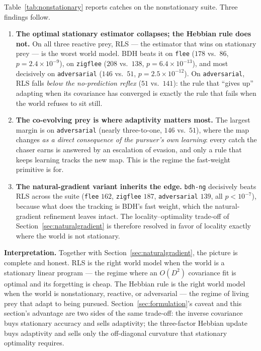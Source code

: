 \documentclass[11pt]{article}
\begin{document}
Table~\ref{tab:nonstationary} reports catches on the nonstationary suite. Three findings follow.

\begin{enumerate}
\item \textbf{The optimal stationary estimator collapses; the Hebbian rule does not.} On all
  three reactive prey, RLS --- the estimator that wins on stationary prey --- is the worst world
  model. BDH beats it on \texttt{flee} ($178$ vs.\ $86$, $p = 2.4 \times 10^{-9}$), on
  \texttt{zigflee} ($208$ vs.\ $138$, $p = 6.4 \times 10^{-13}$), and most decisively on
  \texttt{adversarial} ($146$ vs.\ $51$, $p = 2.5 \times 10^{-12}$). On \texttt{adversarial}, RLS
  falls \emph{below the no-prediction reflex} ($51$ vs.\ $141$): the rule that ``gives up''
  adapting when its covariance has converged is exactly the rule that fails when the world refuses
  to sit still.
\item \textbf{The co-evolving prey is where adaptivity matters most.} The largest margin is on
  \texttt{adversarial} (nearly three-to-one, $146$ vs.\ $51$), where the map changes \emph{as a
  direct consequence of the pursuer's own learning}: every catch the chaser earns is answered by
  an escalation of evasion, and only a rule that keeps learning tracks the new map. This is the
  regime the fast-weight primitive is for.
\item \textbf{The natural-gradient variant inherits the edge.} \texttt{bdh-ng} decisively beats
  RLS across the suite (\texttt{flee} $162$, \texttt{zigflee} $187$, \texttt{adversarial} $139$,
  all $p < 10^{-7}$), because what does the tracking is BDH's fast weight, which the
  natural-gradient refinement leaves intact. The locality--optimality trade-off of
  Section~\ref{sec:naturalgradient} is therefore resolved in favor of locality exactly where the
  world is not stationary.
\end{enumerate}

\textbf{Interpretation.} Together with Section~\ref{sec:naturalgradient}, the picture is complete
and honest. RLS is the right world model when the world is a stationary linear program --- the
regime where an $O(D^2)$ covariance fit is optimal and its forgetting is cheap. The Hebbian rule
is the right world model when the world is nonstationary, reactive, or adversarial --- the regime
of living prey that adapt to being pursued. Section~\ref{sec:formulation}'s caveat and this
section's advantage are two sides of the same trade-off: the inverse covariance buys stationary
accuracy and sells adaptivity; the three-factor Hebbian update buys adaptivity and sells only the
off-diagonal curvature that stationary optimality requires.
\end{document}
